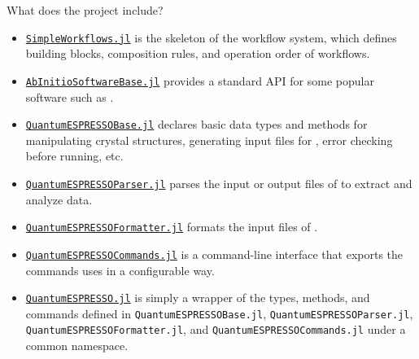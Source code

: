 \begin{frame}[allowframebreaks]{What does the \express{} project include?}
\begin{itemize}
        \item \href{https://github.com/MineralsCloud/SimpleWorkflows.jl}{\texttt{SimpleWorkflows.jl}}
              is the skeleton of the workflow system, which
              defines building blocks, composition rules, and operation order of workflows.
        \item \href{https://github.com/MineralsCloud/AbInitioSoftwareBase.jl}{\texttt{AbInitio\-Software\-Base.jl}}
              provides a standard API for some popular \ab{} software such as \qe.
        \item \href{https://github.com/MineralsCloud/QuantumESPRESSOBase.jl}{\texttt{Quantum\-ESPRESSO\-Base.jl}}
              declares basic data types and methods
              for manipulating crystal structures, generating input files for \qe,
              error checking before running, etc.
        \item \href{https://github.com/MineralsCloud/QuantumESPRESSOParser.jl}{\texttt{Quantum\-ESPRESSO\-Parser.jl}}
              parses the input or output files of \qe{} to extract and analyze data.
        \item \href{https://github.com/MineralsCloud/QuantumESPRESSOFormatter.jl}{\texttt{Quantum\-ESPRESSO\-Formatter.jl}}
              formats the input files of \qe.
        \item \href{https://github.com/MineralsCloud/QuantumESPRESSOCommands.jl}{\texttt{Quantum\-ESPRESSO\-Commands.jl}}
              is a command-line interface that exports the commands \qe{} uses in a configurable way.
        \item \href{https://github.com/MineralsCloud/QuantumESPRESSO.jl}{\texttt{QuantumESPRESSO.jl}}
              is simply a wrapper of the types, methods, and commands defined in
              \texttt{Quantum\-ESPRESSO\-Base.jl}, \texttt{Quantum\-ESPRESSO\-Parser.jl},
              \texttt{Quantum\-ESPRESSO\-Formatter.jl},
              and \texttt{Quantum\-ESPRESSO\-Commands.jl} under a common namespace.
    \end{itemize}
\end{frame}
